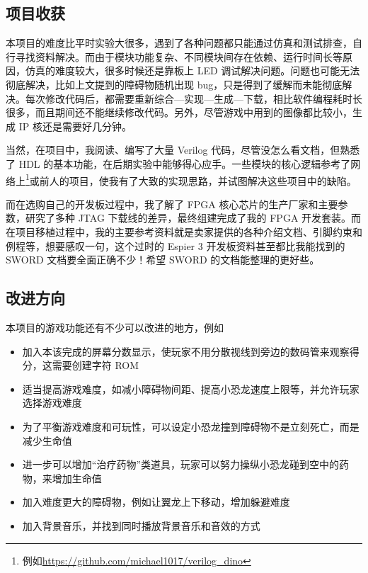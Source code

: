 \documentclass[hyperref,UTF8,12pt,a4paper]{ctexart}
\providecommand{\tightlist}{%
  \setlength{\itemsep}{0pt}\setlength{\parskip}{0pt}}
\begin{document}
\hypertarget{ux9879ux76eeux6536ux83b7}{%
\subsection{项目收获}\label{ux9879ux76eeux6536ux83b7}}

本项目的难度比平时实验大很多，遇到了各种问题都只能通过仿真和测试排查，自行寻找资料解决。而由于模块功能复杂、不同模块间存在依赖、运行时间长等原因，仿真的难度较大，很多时候还是靠板上
LED 调试解决问题。问题也可能无法彻底解决，比如上文提到的障碍物随机出现
bug，只是得到了缓解而未能彻底解决。每次修改代码后，都需要重新综合---实现---生成---下载，相比软件编程耗时长很多，而且期间还不能继续修改代码。另外，尽管游戏中用到的图像都比较小，生成
IP 核还是需要好几分钟。

当然，在项目中，我阅读、编写了大量 Verilog
代码，尽管没怎么看文档，但熟悉了 HDL
的基本功能，在后期实验中能够得心应手。一些模块的核心逻辑参考了网络上\footnote{例如\url{https://github.com/michael1017/verilog_dino}}或前人的项目，使我有了大致的实现思路，并试图解决这些项目中的缺陷。

而在选购自己的开发板过程中，我了解了 FPGA
核心芯片的生产厂家和主要参数，研究了多种 JTAG
下载线的差异，最终组建完成了我的 FPGA
开发套装。而在项目移植过程中，我的主要参考资料就是卖家提供的各种介绍文档、引脚约束和例程等，想要感叹一句，这个过时的
Espier 3 开发板资料甚至都比我能找到的 SWORD 文档要全面正确不少！希望
SWORD 的文档能整理的更好些。

\hypertarget{ux6539ux8fdbux65b9ux5411}{%
\subsection{改进方向}\label{ux6539ux8fdbux65b9ux5411}}

本项目的游戏功能还有不少可以改进的地方，例如

\begin{itemize}
\tightlist
\item
  加入本该完成的屏幕分数显示，使玩家不用分散视线到旁边的数码管来观察得分，这需要创建字符
  ROM
\item
  适当提高游戏难度，如减小障碍物间距、提高小恐龙速度上限等，并允许玩家选择游戏难度
\item
  为了平衡游戏难度和可玩性，可以设定小恐龙撞到障碍物不是立刻死亡，而是减少生命值
\item
  进一步可以增加``治疗药物''类道具，玩家可以努力操纵小恐龙碰到空中的药物，来增加生命值
\item
  加入难度更大的障碍物，例如让翼龙上下移动，增加躲避难度
\item
  加入背景音乐，并找到同时播放背景音乐和音效的方式
\end{itemize}
\end{document}
